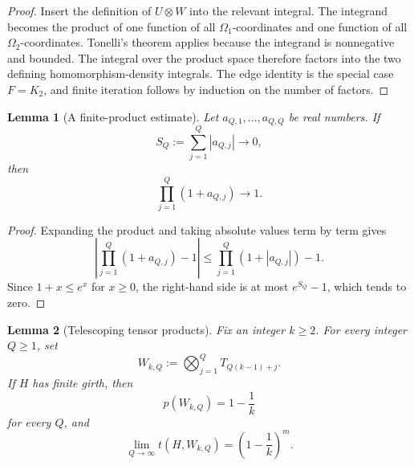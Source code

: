 \documentclass[11pt]{article}
\newtheorem{lemma}{Lemma}
\begin{document}
\begin{proof}
Insert the definition of \(U \otimes W\) into the relevant integral.
The integrand becomes the product of one function of all
\(\Omega_1\)-coordinates and one function of all
\(\Omega_2\)-coordinates.  Tonelli's theorem applies because the
integrand is nonnegative and bounded.  The integral over the product
space therefore factors into the two defining homomorphism-density
integrals.  The edge identity is the special case \(F=K_2\), and finite
iteration follows by induction on the number of factors.
\end{proof}

\begin{lemma}[A finite-product estimate]\label{lem:product-estimate}
Let \(a_{Q,1},\dots,a_{Q,Q}\) be real numbers.  If
\[
    S_Q:=\sum_{j=1}^{Q}|a_{Q,j}|\longrightarrow0,
\]
then
\[
    \prod_{j=1}^{Q}(1+a_{Q,j})\longrightarrow1.
\]
\end{lemma}

\begin{proof}
Expanding the product and taking absolute values term by term gives
\[
    \left|\prod_{j=1}^{Q}(1+a_{Q,j})-1\right|
    \le
    \prod_{j=1}^{Q}(1+|a_{Q,j}|)-1.
\]
Since \(1+x\le e^x\) for \(x\ge0\), the right-hand side is at most
\(e^{S_Q}-1\), which tends to zero.
\end{proof}

\begin{lemma}[Telescoping tensor products]\label{lem:telescoping}
Fix an integer \(k\ge2\).  For every integer \(Q\ge1\), set
\[
    W_{k,Q}
    :=
    \bigotimes_{j=1}^{Q} T_{Q(k-1)+j}.
\]
If \(H\) has finite girth, then
\[
    p(W_{k,Q})=1-\frac1k
\]
for every \(Q\), and
\[
    \lim_{Q\to\infty}t(H,W_{k,Q})
    =
    \left(1-\frac1k\right)^m.
\]
\end{lemma}
\end{document}
